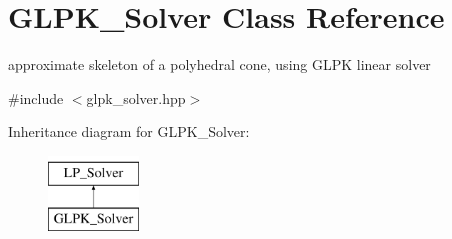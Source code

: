 \hypertarget{class_g_l_p_k___solver}{}\section{G\+L\+P\+K\+\_\+\+Solver Class Reference}
\label{class_g_l_p_k___solver}


approximate skeleton of a polyhedral cone, using G\+L\+PK linear solver  




{\ttfamily \#include $<$glpk\+\_\+solver.\+hpp$>$}

Inheritance diagram for G\+L\+P\+K\+\_\+\+Solver\+:\begin{figure}[H]
\begin{center}
\leavevmode
\includegraphics[height=2.000000cm]{class_g_l_p_k___solver}
\end{center}
\end{figure}

